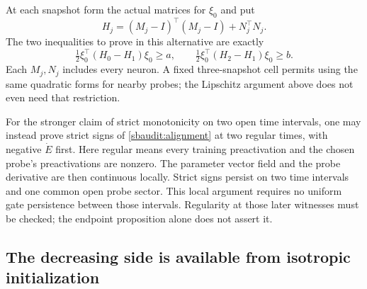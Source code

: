 \documentclass{article} %
\theoremstyle{plain}
\theoremstyle{definition}
\theoremstyle{remark}
\begin{document}
At each snapshot form the actual matrices for $\xi_0$ and put
\[
 H_j=(M_j-I)^\top(M_j-I)+N_j^\top N_j.
\]
The two inequalities to prove in this alternative are exactly
\begin{equation}\label{sbaudit:matrix-secants}
 \tfrac12\xi_0^\top(H_0-H_1)\xi_0\ge a,
 \qquad
 \tfrac12\xi_0^\top(H_2-H_1)\xi_0\ge b.
\end{equation}
Each $M_j,N_j$ includes every neuron. A fixed three-snapshot cell permits
using the same quadratic forms for nearby probes; the Lipschitz argument
above does not even need that restriction.

For the stronger claim of strict monotonicity on two open time intervals,
one may instead prove strict signs of \eqref{sbaudit:alignment} at two
regular times, with negative $\dot E$ first. Here regular means every
training preactivation and the chosen probe's preactivations are nonzero.
The parameter vector field and the probe derivative are then continuous
locally. Strict signs persist on two time intervals and one common open
probe sector. This local argument requires no uniform gate persistence
between those intervals. Regularity at those later witnesses must be
checked; the endpoint proposition alone does not assert it.

\subsection{The decreasing side is available from isotropic initialization}
\end{document}

